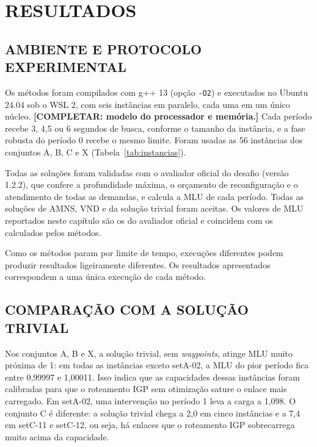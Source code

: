 \chapter{RESULTADOS}
\label{cap:resultados}

\section{\uppercase{Ambiente e Protocolo Experimental}}

Os métodos foram compilados com g++ 13 (opção \texttt{-O2}) e executados no Ubuntu 24.04 sob o WSL 2, com seis instâncias em paralelo, cada uma em um único núcleo. \textbf{[COMPLETAR: modelo do processador e memória.]} Cada período recebe 3, 4,5 ou 6 segundos de busca, conforme o tamanho da instância, e a fase robusta do período 0 recebe o mesmo limite. Foram usadas as 56 instâncias dos conjuntos A, B, C e X (Tabela~\ref{tab:instancias}).

Todas as soluções foram validadas com o avaliador oficial do desafio (versão 1.2.2), que confere a profundidade máxima, o orçamento de reconfiguração e o atendimento de todas as demandas, e calcula a MLU de cada período. Todas as soluções de AMNS, VND e da solução trivial foram aceitas. Os valores de MLU reportados neste capítulo são os do avaliador oficial e coincidem com os calculados pelos métodos.

Como os métodos param por limite de tempo, execuções diferentes podem produzir resultados ligeiramente diferentes. Os resultados apresentados correspondem a uma única execução de cada método.

\section{\uppercase{Comparação com a Solução Trivial}}

Nos conjuntos A, B e X, a solução trivial, sem \textit{waypoints}, atinge MLU muito próxima de 1: em todas as instâncias exceto setA-02, a MLU do pior período fica entre 0,99997 e 1,00011. Isso indica que as capacidades dessas instâncias foram calibradas para que o roteamento IGP sem otimização sature o enlace mais carregado. Em setA-02, uma intervenção no período 1 leva a carga a 1,098. O conjunto C é diferente: a solução trivial chega a 2,0 em cinco instâncias e a 7,4 em setC-11 e setC-12, ou seja, há enlaces que o roteamento IGP sobrecarrega muito acima da capacidade.

